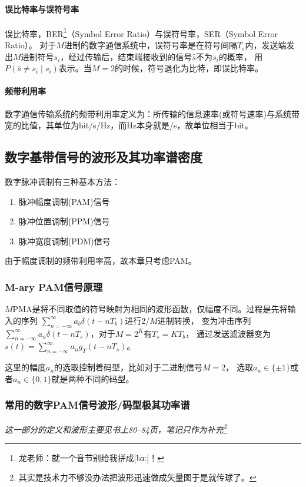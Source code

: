     \paragraph{误比特率与误符号率}\mbox{}

    误比特率，BER\footnote{龙老师：就一个音节别给我拼成[bɜː]！}（Symbol Error Ratio）与误符号率，SER（Symbol Error Ratio）。
    对于$M$进制的数字通信系统中，误符号率是在符号间隔$T_s$内，发送端发出$M$进制符号$s_i$，经过传输后，结束端接收到的信号$\hat s$不为$s_i$的概率，
    用$P\left(\hat s\neq s_i\mid s_i\right)$表示。当$M=2$的时候，符号退化为比特，即误比特率。

    \paragraph{频带利用率}\mbox{}

    数字通信传输系统的频带利用率定义为：所传输的信息速率(或符号速率)与系统带宽的比值，其单位为bit/s/Hz，而Hz本身就是/s，故单位相当于bit。

\subsection{数字基带信号的波形及其功率谱密度}
    数字脉冲调制有三种基本方法：
    \begin{enumerate}[itemsep=0pt,parsep=0em,label=\color{bupt}\arabic*、,labelsep=0pt,leftmargin=4em]
        \item 脉冲幅度调制(PAM)信号
        \item 脉冲位置调制(PPM)信号
        \item 脉冲宽度调制(PDM)信号
    \end{enumerate}
    由于幅度调制的频带利用率高，故本章只考虑PAM。

    \subsubsection{M-ary PAM信号原理}
    $M$PMA是将不同取值的符号映射为相同的波形函数，仅幅度不同。过程是先将输入的序列
    $\displaystyle\sum_{n=-\infty}^{\infty}a_b\delta(t-nT_b)$进行2/$M$进制转换，
    变为冲击序列$\displaystyle\sum_{n=-\infty}^{\infty}a_n\delta(t-nT_s)$，对于$M=2^K$有$T_s=KT_b$，
    通过发送滤波器变为$s(t)=\displaystyle\sum_{n=-\infty}^{\infty}a_ng_T(t-nT_s)$。

    这里的幅度$a_n$的选取控制着码型，比如对于二进制信号$M=2$，
    选取$a_n\in\{\pm 1\}$或者$a_n\in\{0,1\}$就是两种不同的码型。
    
    \subsubsection{常用的数字PAM信号波形/码型极其功率谱}
    \emph{这一部分的定义和波形主要见书上80--84页，笔记只作为补充\footnote{其实是技术力不够没办法把波形迅速做成矢量图于是就传球了。}}
    
